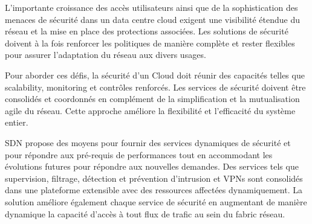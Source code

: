 
L'importante croissance des accès utilisateurs ainsi que de la sophistication des menaces de sécurité dans un data centre cloud exigent une visibilité étendue du réseau et la mise en place des protections associées. Les solutions de sécurité doivent à la fois renforcer les politiques de manière complète et rester flexibles pour assurer l'adaptation du réseau aux divers usages.


Pour aborder ces défis, la sécurité d'un Cloud doit réunir des capacités telles que \gls{scalability}, monitoring et contrôles renforcés. Les services de sécurité doivent être consolidés et coordonnés en complément de la simplification et la mutualisation agile du réseau. Cette approche améliore la flexibilité et l'efficacité du système entier.

SDN propose des moyens pour fournir des services dynamiques de sécurité et pour répondre aux pré-requis de performances tout en accommodant les évolutions futures pour répondre aux nouvelles demandes. Des services tels que supervision, filtrage, détection et prévention d'intrusion et VPNs sont consolidés dans une plateforme extensible avec des ressources affectées dynamiquement. La solution améliore également chaque service de sécurité en augmentant de manière dynamique la capacité d'accès à tout flux de trafic au sein du \gls{fabric} réseau.

